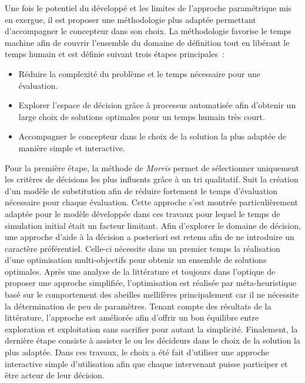 Une fois le potentiel du  développé et les limites de l’approche paramétrique
mis en exergue, il est proposer une méthodologie plus adaptée permettant d’accompagner
le concepteur dans son choix. La méthodologie favorise
le temps machine afin de couvrir l’ensemble du domaine de définition tout
en libérant le temps humain et est définie suivant trois étapes principales~:
\begin{itemize}
    \item Réduire la complexité du problème et le temps nécessaire pour une évaluation.
    \item Explorer l’espace de décision grâce à processus automatisée afin d’obtenir
          un large choix de solutions optimales pour un temps humain très court.
    \item Accompagner le concepteur dans le choix de la solution la plus adaptée
          de manière simple et interactive.
\end{itemize}
Pour la première étape, la méthode de \textit{Morris} permet de sélectionner uniquement
les critères de décisions les plus influents grâce à un tri qualitatif. Suit la
création d’un modèle de substitution afin de réduire fortement le temps d’évaluation
nécessaire pour chaque évaluation. Cette approche s’est montrée particulièrement adaptée
pour le modèle développée dans ces travaux pour lequel le temps de simulation initial
était un facteur limitant.
Afin d’explorer le domaine de décision, une approche d’aide à la décision a posteriori
est retenu afin de ne introduire un caractère préférentiel. Celle-ci nécessite dans un premier temps la réalisation d’une optimisation
multi-objectifs pour obtenir un ensemble de solutions optimales. Après une
analyse de la littérature et toujours dans l’optique de proposer une approche simplifiée,
l’optimisation est réalisée par méta-heuristique basé sur le comportement des abeilles
mellifères principalement car il ne nécessite la détermination de peu de paramètres. Tenant compte
des résultats de la littérature, l’approche est améliorée afin d’offrir un bon équilibre entre
exploration et exploitation sans sacrifier pour autant la simplicité. Finalement, la dernière
étape consiste à assister le ou les décideurs dans le choix de la solution la plus adaptée.
Dans ces travaux, le choix a été fait d’utiliser une approche interactive simple d’utilisation
afin que chaque intervenant puisse participer et être acteur de leur décision.

